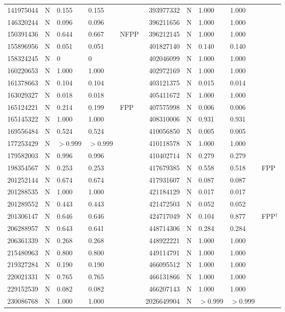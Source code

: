 \documentclass[11pt]{article}
\begin{document}
\begin{center}
\begin{longtable}{rllll@{\hspace{2.5em}}rllll}
141975044 & N & 0.155 & 0.155 &  & 393977332 & N & 1.000 & 1.000 &  \\
146320244 & N & 0.096 & 0.096 &  & 396211656 & N & 1.000 & 1.000 &  \\
150391436 & N & 0.644 & 0.667 & NFPP & 396212145 & N & 1.000 & 1.000 &  \\
155896956 & N & 0.051 & 0.051 &  & 401827140 & N & 0.140 & 0.140 &  \\
158324245 & N & 0 & 0 &  & 402046099 & N & 1.000 & 1.000 &  \\
160220653 & N & 1.000 & 1.000 &  & 402972169 & N & 1.000 & 1.000 &  \\
161378663 & N & 0.104 & 0.104 &  & 403121375 & N & 0.015 & 0.014 &  \\
163029327 & N & 0.018 & 0.018 &  & 405411672 & N & 1.000 & 1.000 &  \\
165124221 & N & 0.214 & 0.199 & FPP & 407575998 & N & 0.006 & 0.006 &  \\
165145322 & N & 1.000 & 1.000 &  & 408310006 & N & 0.931 & 0.931 &  \\
169556484 & N & 0.524 & 0.524 &  & 410056850 & N & 0.005 & 0.005 &  \\
177253429 & N & $>0.999$ & $>0.999$ &  & 410118578 & N & 1.000 & 1.000 &  \\
179582003 & N & 0.996 & 0.996 &  & 410402714 & N & 0.279 & 0.279 &  \\
198354567 & N & 0.253 & 0.253 &  & 417679385 & N & 0.558 & 0.518 & FPP \\
201252144 & N & 0.674 & 0.674 &  & 417931607 & N & 0.087 & 0.087 &  \\
201288535 & N & 1.000 & 1.000 &  & 421184129 & N & 0.017 & 0.017 &  \\
201289552 & N & 0.443 & 0.443 &  & 421472503 & N & 0.052 & 0.052 &  \\
201306147 & N & 0.646 & 0.646 &  & 424717049 & N & 0.104 & 0.877 & FPP$^{\dagger}$ \\
206288957 & N & 0.643 & 0.641 &  & 448714306 & N & 0.284 & 0.284 &  \\
206361339 & N & 0.268 & 0.268 &  & 448922221 & N & 1.000 & 1.000 &  \\
215480963 & N & 0.800 & 0.800 &  & 449114791 & N & 1.000 & 1.000 &  \\
219327284 & N & 0.190 & 0.190 &  & 466095512 & N & 1.000 & 1.000 &  \\
220021331 & N & 0.765 & 0.765 &  & 466131866 & N & 1.000 & 1.000 &  \\
229152539 & N & 0.082 & 0.082 &  & 466207143 & N & 1.000 & 1.000 &  \\
230086768 & N & 1.000 & 1.000 &  & 2026649904 & N & $>0.999$ & $>0.999$ &  \\
\end{longtable}
\end{center}
\end{document}
